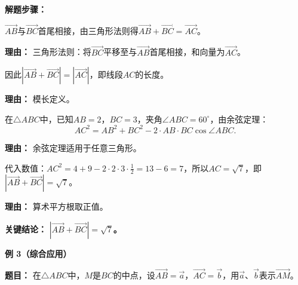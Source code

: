 \begin{examplebox}
	\textbf{\textcolor{CExample}{解题步骤：}}
	\begin{description}[style=nextline, leftmargin=2.8em, labelsep=0.5em, itemsep=0.45em]
		\item[\textbf{第一步（识别加法）：}] $\overrightarrow{AB}$与$\overrightarrow{BC}$首尾相接，由三角形法则得$\overrightarrow{AB}+\overrightarrow{BC}=\overrightarrow{AC}$。
			\par\textbf{理由：}
			三角形法则：将$\overrightarrow{BC}$平移至与$\overrightarrow{AB}$首尾相接，和向量为$\overrightarrow{AC}$。
		\item[\textbf{第二步（转化问题）：}] 因此$|\overrightarrow{AB}+\overrightarrow{BC}|=|\overrightarrow{AC}|$，即线段$AC$的长度。
			\par\textbf{理由：}
			模长定义。
		\item[\textbf{第三步（余弦定理）：}] 在$\triangle ABC$中，已知$AB=2$，$BC=3$，夹角$\angle ABC=60^\circ$，由余弦定理：
			\[
				AC^2 = AB^2 + BC^2 - 2\cdot AB\cdot BC\cos\angle ABC.
			\]
			\par\textbf{理由：}
			余弦定理适用于任意三角形。
		\item[\textbf{第四步（计算结果）：}] 代入数值：$AC^2=4+9-2\cdot2\cdot3\cdot\frac12=13-6=7$，所以$AC=\sqrt{7}$，即$|\overrightarrow{AB}+\overrightarrow{BC}|=\sqrt{7}$。
			\par\textbf{理由：}
			算术平方根取正值。
	\end{description}

	\textbf{\textcolor{CExample}{关键结论：}}
	\textbf{$|\overrightarrow{AB}+\overrightarrow{BC}|=\sqrt{7}$。}

	\medskip
	\textbf{\textcolor{CExample}{例 3（综合应用）}}

	\textbf{\textcolor{CExample}{题目：}}
	在$\triangle ABC$中，$M$是$BC$的中点，设$\overrightarrow{AB}=\vec{a}$，$\overrightarrow{AC}=\vec{b}$，用$\vec{a}$、$\vec{b}$表示$\overrightarrow{AM}$。


\end{examplebox}
